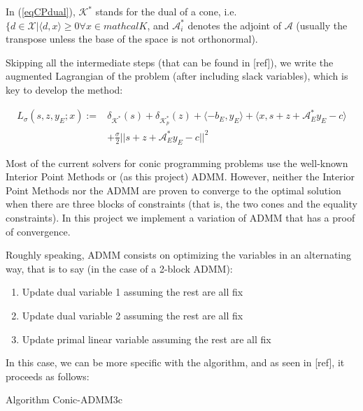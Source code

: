\documentclass[paper=a4, fontsize=11pt]{scrartcl}
\numberwithin{equation}{section}		%
\numberwithin{figure}{section}			%
\numberwithin{table}{section}				%
\begin{document}
In (\ref{eqCPdual}), $\mathcal{K}^*$ stands for the dual of a cone, i.e. $\{d \in \mathcal{X} | \langle d,x \rangle \geq 0 \forall x \in mathcal{K}$, and $\mathcal{A}_i^*$ denotes the adjoint of $\mathcal{A}$ (usually the transpose unless the base of the space is not orthonormal). 

Skipping all the intermediate steps (that can be found in [ref]), we write the augmented Lagrangian of the problem (after including slack variables), which is key to develop the method:

\begin{align*}
L_{\sigma} (s,z,y_E;x) := & \delta_{\mathcal{K}^*}(s) + \delta_{\mathcal{K}_p^*}(z) + \langle -b_E,y_E \rangle  + \langle x,s+z+\mathcal{A}_E^* y_E - c\rangle \\
& + \frac{\sigma}{2}||s+z+\mathcal{A}_E^* y_E - c||^2 
\end{align*}

Most of the current solvers for conic programming problems use the well-known Interior Point Methods or (as this project) ADMM. However, neither the Interior Point Methods nor the ADMM are proven to converge to the optimal solution when there are three blocks of constraints (that is, the two cones and the equality constraints). In this project we implement a variation of ADMM that has a proof of convergence.

Roughly speaking, ADMM consists on optimizing the variables in an alternating way, that is to say (in the case of a 2-block ADMM):
\begin{enumerate}
\item Update dual variable 1 assuming the rest are all fix
\item Update dual variable 2 assuming the rest are all fix
\item Update primal linear variable assuming the rest are all fix
\end{enumerate}
 
In this case, we can be more specific with the algorithm, and as seen in [ref], it proceeds as follows:
\begin{algorithm}
	\caption{Algorithm Conic-ADMM3c}
\end{algorithm}
\end{document}
